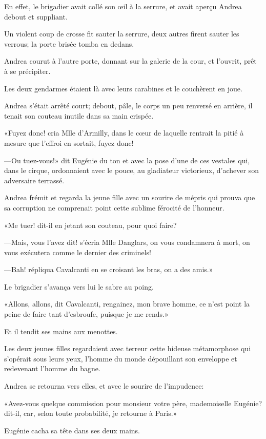 En effet, le brigadier avait collé son œil à la serrure, et avait aperçu Andrea debout et suppliant. 

Un violent coup de crosse fit sauter la serrure, deux autres firent sauter les verrous; la porte brisée tomba en dedans. 

Andrea courut à l'autre porte, donnant sur la galerie de la cour, et l'ouvrit, prêt à se précipiter. 

Les deux gendarmes étaient là avec leurs carabines et le couchèrent en joue. 

Andrea s'était arrêté court; debout, pâle, le corps un peu renversé en arrière, il tenait son couteau inutile dans sa main crispée. 

«Fuyez donc! cria Mlle d'Armilly, dans le cœur de laquelle rentrait la pitié à mesure que l'effroi en sortait, fuyez donc! 

—Ou tuez-vous!» dit Eugénie du ton et avec la pose d'une de ces vestales qui, dans le cirque, ordonnaient avec le pouce, au gladiateur victorieux, d'achever son adversaire terrassé. 

Andrea frémit et regarda la jeune fille avec un sourire de mépris qui prouva que sa corruption ne comprenait point cette sublime férocité de l'honneur. 

«Me tuer! dit-il en jetant son couteau, pour quoi faire? 

—Mais, vous l'avez dit! s'écria Mlle Danglars, on vous condamnera à mort, on vous exécutera comme le dernier des criminels! 

—Bah! répliqua Cavalcanti en se croisant les bras, on a des amis.» 

Le brigadier s'avança vers lui le sabre au poing. 

«Allons, allons, dit Cavalcanti, rengainez, mon brave homme, ce n'est point la peine de faire tant d'esbroufe, puisque je me rends.» 

Et il tendit ses mains aux menottes. 

Les deux jeunes filles regardaient avec terreur cette hideuse métamorphose qui s'opérait sous leurs yeux, l'homme du monde dépouillant son enveloppe et redevenant l'homme du bagne. 

Andrea se retourna vers elles, et avec le sourire de l'impudence: 

«Avez-vous quelque commission pour monsieur votre père, mademoiselle Eugénie? dit-il, car, selon toute probabilité, je retourne à Paris.» 

Eugénie cacha sa tête dans ses deux mains. 

